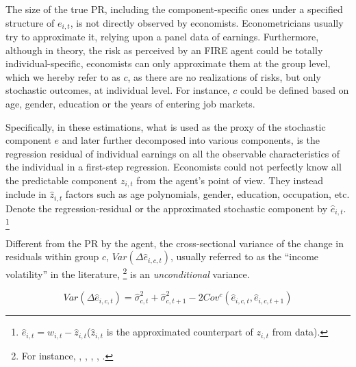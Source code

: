 The size of the true PR, including the component-specific ones under a specified structure of $e_{i,t}$, is not directly observed by economists. Econometricians 
usually try to approximate it, relying upon a panel data of earnings. Furthermore, although in theory, the risk as perceived by an FIRE agent could be totally individual-specific, economists can only approximate them at the group level, which we hereby refer to as $c$, as there are no realizations of risks, but only stochastic outcomes, at individual level. For instance, $c$ could be defined based on age, gender, education or the years of entering job markets. 


Specifically, in these estimations, what is used as the proxy of the stochastic component $e$ and later further decomposed into various components, is the regression residual of individual earnings on all the observable characteristics of the individual in a first-step regression. Economists could not perfectly know all the predictable component $z_{i,t}$ from the agent's point of view. They instead include in $\hat z_{i,t}$ factors such as age polynomials, gender, education, occupation, etc. Denote the regression-residual or the approximated stochastic component by $\hat e_{i,t}$. \footnote{$\hat e_{i,t}= w_{i,t}-\hat z_{i,t}$($\hat z_{i,t}$ is the
approximated counterpart of $z_{i,t}$ from data). } 


Different from the PR by the agent, the cross-sectional variance of the change in residuals within group $c$, $Var(\Delta \hat e_{i,c,t})$, usually referred to as the ``income volatility'' in the literature, \footnote{For instance, \cite{gottschalk1994growth}, \cite{moffitt2002trends}, \cite{sabelhaus2010great}, \cite{dynan2012evolution}, \cite{bloom2018great}.} is an  \emph{unconditional} variance. 

\begin{equation}
\label{Eq:definition_volatility}
Var(\Delta \hat e_{i,c,t}) = \hat\sigma^2_{c,t}+ \hat\sigma^2_{c,t+1} - 2Cov^c(\hat e_{i,c,t},\hat e_{i,c,t+1})
\end{equation}


